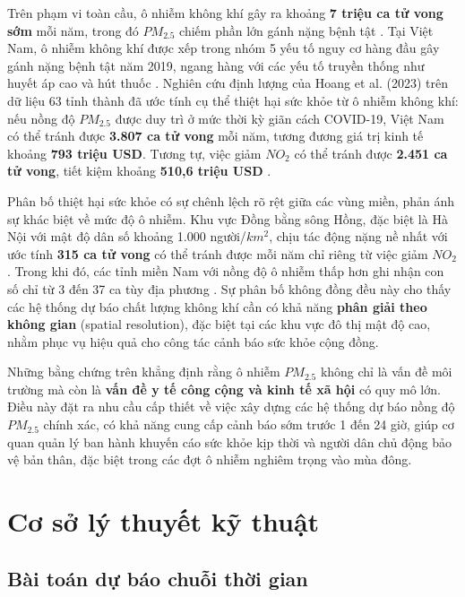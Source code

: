 Trên phạm vi toàn cầu, ô nhiễm không khí gây ra khoảng \textbf{7 triệu ca tử vong sớm} mỗi năm, trong đó $PM_{2.5}$ chiếm phần lớn gánh nặng bệnh tật \cite{krzyzanowski2014megacities}. Tại Việt Nam, ô nhiễm không khí được xếp trong nhóm 5 yếu tố nguy cơ hàng đầu gây gánh nặng bệnh tật năm 2019, ngang hàng với các yếu tố truyền thống như huyết áp cao và hút thuốc \cite{hoang2023health}. Nghiên cứu định lượng của Hoang et al. (2023) trên dữ liệu 63 tỉnh thành đã ước tính cụ thể thiệt hại sức khỏe từ ô nhiễm không khí: nếu nồng độ $PM_{2.5}$ được duy trì ở mức thời kỳ giãn cách COVID-19, Việt Nam có thể tránh được \textbf{3.807 ca tử vong} mỗi năm, tương đương giá trị kinh tế khoảng \textbf{793 triệu USD}. Tương tự, việc giảm $NO_2$ có thể tránh được \textbf{2.451 ca tử vong}, tiết kiệm khoảng \textbf{510,6 triệu USD} \cite{hoang2023health}. 

Phân bố thiệt hại sức khỏe có sự chênh lệch rõ rệt giữa các vùng miền, phản ánh sự khác biệt về mức độ ô nhiễm. Khu vực Đồng bằng sông Hồng, đặc biệt là Hà Nội với mật độ dân số khoảng 1.000 người/$km^2$, chịu tác động nặng nề nhất với ước tính \textbf{315 ca tử vong} có thể tránh được mỗi năm chỉ riêng từ việc giảm $NO_2$ \cite{hoang2023health}. Trong khi đó, các tỉnh miền Nam với nồng độ ô nhiễm thấp hơn ghi nhận con số chỉ từ 3 đến 37 ca tùy địa phương \cite{hoang2023health}. Sự phân bố không đồng đều này cho thấy các hệ thống dự báo chất lượng không khí cần có khả năng \textbf{phân giải theo không gian} (spatial resolution), đặc biệt tại các khu vực đô thị mật độ cao, nhằm phục vụ hiệu quả cho công tác cảnh báo sức khỏe cộng đồng.

Những bằng chứng trên khẳng định rằng ô nhiễm $PM_{2.5}$ không chỉ là vấn đề môi trường mà còn là \textbf{vấn đề y tế công cộng và kinh tế xã hội} có quy mô lớn. Điều này đặt ra nhu cầu cấp thiết về việc xây dựng các hệ thống dự báo nồng độ $PM_{2.5}$ chính xác, có khả năng cung cấp cảnh báo sớm trước 1 đến 24 giờ, giúp cơ quan quản lý ban hành khuyến cáo sức khỏe kịp thời và người dân chủ động bảo vệ bản thân, đặc biệt trong các đợt ô nhiễm nghiêm trọng vào mùa đông.

\section{Cơ sở lý thuyết kỹ thuật}
\subsection{Bài toán dự báo chuỗi thời gian}

